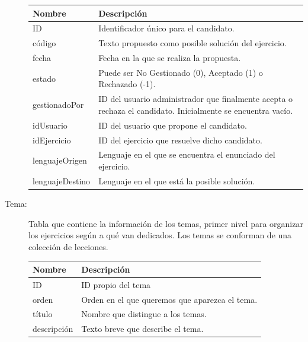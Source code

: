 \begin{description}
\begin{tabularx}{14cm}{|l|X|}
\hline
\textbf{Nombre} & \textbf{Descripción}                                                              \\ \hline
ID              & Identificador único para el candidato.                                         \\ \hline
código        & Texto propuesto como posible solución del ejercicio. \\ \hline
fecha      & Fecha en la que se realiza la propuesta. \\ \hline
estado              & Puede ser No Gestionado (0), Aceptado (1) o Rechazado (-1).                                         \\ \hline
gestionadoPor        & ID del usuario administrador que finalmente acepta o rechaza el candidato. Inicialmente se encuentra vacío. \\ \hline
idUsuario      & ID del usuario que propone el candidato. \\ \hline
idEjercicio              & ID del ejercicio que resuelve dicho candidato.                                         \\ \hline
lenguajeOrigen        & Lenguaje en el que se encuentra el enunciado del ejercicio. \\ \hline
lenguajeDestino      & Lenguaje en el que está la posible solución. \\ \hline
\end{tabularx}
\vspace{1em}

\item[Tema:] Tabla que contiene la información de los temas, primer nivel para organizar los ejercicios según a qué van dedicados. Los temas se conforman de una colección de lecciones.

\begin{tabularx}{14cm}{|l|X|}
\hline
\textbf{Nombre} & \textbf{Descripción}                                                              \\ \hline
ID       & ID propio del tema                                                           \\ \hline
orden     & Orden en el que queremos que aparezca el tema.                                           \\ \hline
título            & Nombre que distingue a los temas. \\ \hline
descripción            & Texto breve que describe el tema. \\ \hline
\end{tabularx}
\vspace{1em}


\end{description}
